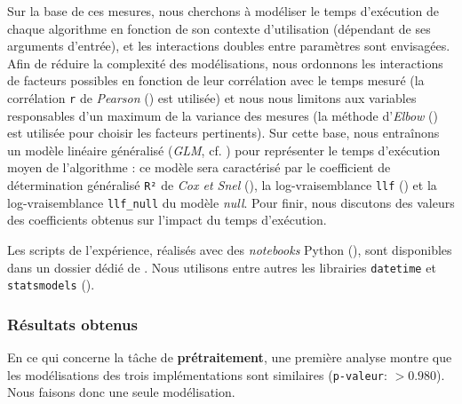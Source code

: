 			Sur la base de ces mesures, nous cherchons à modéliser le temps d'exécution de chaque algorithme en fonction de son contexte d'utilisation (dépendant de ses arguments d'entrée), et les interactions doubles entre paramètres sont envisagées.
			Afin de réduire la complexité des modélisations, nous ordonnons les interactions de facteurs possibles en fonction de leur corrélation avec le temps mesuré (la corrélation \texttt{r} de \textit{Pearson} (\cite{kirch:2008:pearson-correlation-coefficient}) est utilisée) et nous nous limitons aux variables responsables d'un maximum de la variance des mesures (la méthode d'\textit{Elbow} (\cite{thorndike:1953:who-belongs-family}) est utilisée pour choisir les facteurs pertinents).
			Sur cette base, nous entraînons un modèle linéaire généralisé (\textit{GLM}, cf. \cite{nelder-wedderburn:1972:generalized-linear-models}) pour représenter le temps d'exécution moyen de l'algorithme : ce modèle sera caractérisé par le coefficient de détermination généralisé \texttt{R²} de \textit{Cox et Snel} (\cite{diamond-etal:1990:analysis-binary-data}), la log-vraisemblance \texttt{llf} (\cite{edwards:1992:likelihood}) et la log-vraisemblance \texttt{llf\_null} du modèle \textit{null}.
			Pour finir, nous discutons des valeurs des coefficients obtenus sur l'impact du temps d'exécution.
			
			\begin{leftBarInformation}
				Les scripts de l'expérience, réalisés avec des \textit{notebooks} Python (\cite{van-rossum-drake:2009:python-reference-manual}), sont disponibles dans un dossier dédié de \cite{schild:2021:cognitivefactory-interactiveclusteringcomparativestudy}.
				Nous utilisons entre autres les librairies \texttt{datetime} et \texttt{statsmodels} (\cite{seabold-perktold:2010:statsmodels-econometric-statistical}).
			\end{leftBarInformation}

		\subsubsection{Résultats obtenus}
				
			
			En ce qui concerne la tâche de \textbf{prétraitement}, une première analyse montre que les modélisations des trois implémentations sont similaires (\texttt{p-valeur}: $> 0.980$). Nous faisons donc une seule modélisation.
			
